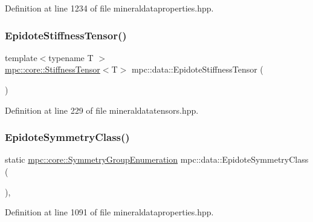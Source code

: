Definition at line 1234 of file mineraldataproperties.\+hpp.

\mbox{\label{namespacempc_1_1data_aabbad6c94ada3a51f642c35209953127}} 
\subsubsection{\texorpdfstring{Epidote\+Stiffness\+Tensor()}{EpidoteStiffnessTensor()}}
{\footnotesize\ttfamily template$<$typename T $>$ \\
\mbox{\hyperlink{structmpc_1_1core_1_1_stiffness_tensor}{mpc\+::core\+::\+Stiffness\+Tensor}}$<$T$>$ mpc\+::data\+::\+Epidote\+Stiffness\+Tensor (\begin{DoxyParamCaption}{ }\end{DoxyParamCaption})}



Definition at line 229 of file mineraldatatensors.\+hpp.

\mbox{\label{namespacempc_1_1data_a9d3532f9c626b30d394b13e2c082377d}} 
\subsubsection{\texorpdfstring{Epidote\+Symmetry\+Class()}{EpidoteSymmetryClass()}}
{\footnotesize\ttfamily static \mbox{\hyperlink{namespacempc_1_1core_a9d979684062547055a0ef5c13077bad8}{mpc\+::core\+::\+Symmetry\+Group\+Enumeration}} mpc\+::data\+::\+Epidote\+Symmetry\+Class (\begin{DoxyParamCaption}{ }\end{DoxyParamCaption})\hspace{0.3cm}{\ttfamily [inline]}, {\ttfamily [static]}}



Definition at line 1091 of file mineraldataproperties.\+hpp.

\mbox{\label{namespacempc_1_1data_a035f12a2127f0e8704a0c714ef3ae237}} 
